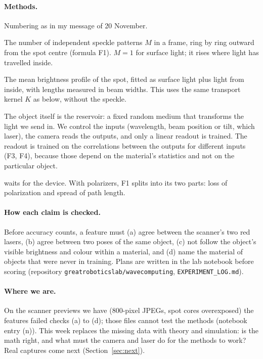 \documentclass[11pt]{article}
\begin{document}
\paragraph{Methods.} Numbering as in my message of 20 November.
\begin{description}[leftmargin=1.2em,itemsep=2pt]
\item[1. Speckle.] The number of independent speckle patterns $M$ in a frame, ring by ring outward from the spot
  centre (formula F1). $M=1$ for surface light; it rises where light has travelled inside.
\item[2. Scattering fit.] The mean brightness profile of the spot, fitted as surface light plus light from inside,
  with lengths measured in beam widths. This uses the same transport kernel $K$ as below, without the speckle.
\item[4. Wave computing.] The object itself is the reservoir: a fixed random medium that transforms the light we send
  in. We control the inputs (wavelength, beam position or tilt, which laser), the camera reads the outputs, and only a
  linear readout is trained. The readout is trained on the correlations between the outputs for different inputs (F3,
  F4), because those depend on the material's statistics and not on the particular object.
\item[3. Polarization] waits for the device. With polarizers, F1 splits into its two parts: loss of polarization and
  spread of path length.
\end{description}

\paragraph{How each claim is checked.} Before accuracy counts, a feature must (a) agree between the scanner's two red
lasers, (b) agree between two poses of the same object, (c) not follow the object's visible brightness and colour
within a material, and (d) name the material of objects that were never in training. Plans are written in the lab
notebook before scoring (repository \texttt{greatroboticslab/wavecomputing}, \texttt{EXPERIMENT\_LOG.md}).

\paragraph{Where we are.} On the scanner previews we have (800-pixel JPEGs, spot cores overexposed) the features
failed checks (a) to (d); those files cannot test the methods (notebook entry (n)). This week replaces the missing
data with theory and simulation: is the math right, and what must the camera and laser do for the methods to work?
Real captures come next (Section~\ref{sec:next}).
\end{document}
